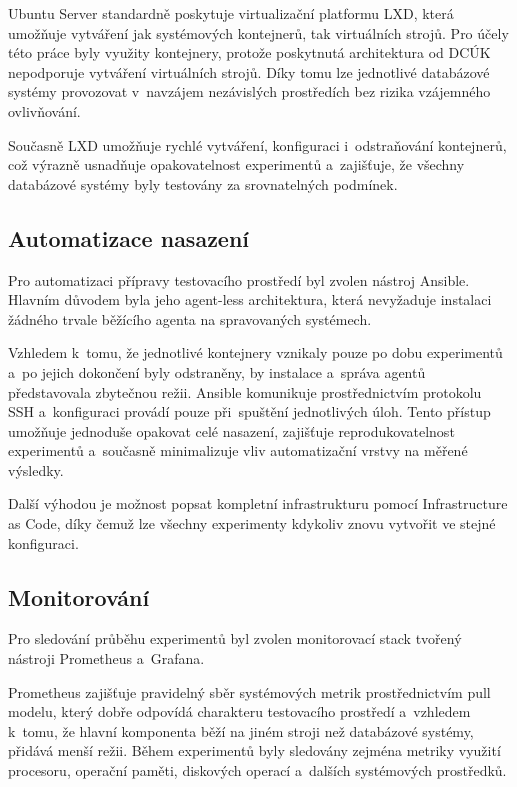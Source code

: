 Ubuntu Server standardně poskytuje virtualizační platformu LXD, která umožňuje vytváření jak systémových kontejnerů, tak virtuálních strojů. 
Pro účely této práce byly využity kontejnery, protože poskytnutá architektura od DCÚK nepodporuje vytváření virtuálních strojů. 
Díky tomu lze jednotlivé databázové systémy provozovat v~navzájem nezávislých prostředích bez rizika vzájemného ovlivňování. 

Současně LXD umožňuje rychlé vytváření, konfiguraci i~odstraňování kontejnerů, což výrazně usnadňuje opakovatelnost experimentů a~zajišťuje, že všechny databázové systémy byly testovány za srovnatelných podmínek.

\subsection{Automatizace nasazení}
Pro automatizaci přípravy testovacího prostředí byl zvolen nástroj Ansible. 
Hlavním důvodem byla jeho agent-less architektura, která nevyžaduje instalaci žádného trvale běžícího agenta na spravovaných systémech.

Vzhledem k~tomu, že jednotlivé kontejnery vznikaly pouze po dobu experimentů a~po jejich dokončení byly odstraněny, by instalace a~správa agentů představovala zbytečnou režii. 
Ansible komunikuje prostřednictvím protokolu SSH a~konfiguraci provádí pouze při~spuštění jednotlivých úloh. 
Tento přístup umožňuje jednoduše opakovat celé nasazení, zajišťuje reprodukovatelnost experimentů a~současně minimalizuje vliv automatizační vrstvy na měřené výsledky.

Další výhodou je možnost popsat kompletní infrastrukturu pomocí Infrastructure as Code, díky čemuž lze všechny experimenty kdykoliv znovu vytvořit ve stejné konfiguraci.

\subsection{Monitorování}
Pro sledování průběhu experimentů byl zvolen monitorovací stack tvořený nástroji Prometheus a~Grafana.

Prometheus zajišťuje pravidelný sběr systémových metrik prostřednictvím pull modelu, který dobře odpovídá charakteru testovacího prostředí a~vzhledem k~tomu, že hlavní komponenta běží na jiném stroji než databázové systémy, přidává menší režii. 
Během experimentů byly sledovány zejména metriky využití procesoru, operační paměti, diskových operací a~dalších systémových prostředků.

